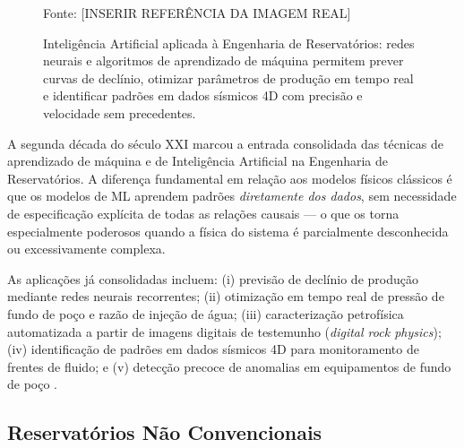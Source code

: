 \documentclass[
  12pt,
  a4paper,
  oneside,
  brazilian,
  sumario=tradicional
]{abntex2}
\renewcommand{\fonte}[1]{\vspace{2pt}\par\noindent\footnotesize Fonte: #1}
\begin{document}
\begin{figure}[H]
  \centering
  \caption{Inteligência Artificial aplicada à Engenharia de Reservatórios: redes neurais e algoritmos de aprendizado de máquina permitem prever curvas de declínio, otimizar parâmetros de produção em tempo real e identificar padrões em dados sísmicos 4D com precisão e velocidade sem precedentes.}
  \label{fig:ia_reservatorio}
  \fonte{[INSERIR REFERÊNCIA DA IMAGEM REAL]}
\end{figure}

A segunda década do século XXI marcou a entrada consolidada das
técnicas de aprendizado de máquina e de Inteligência Artificial na
Engenharia de Reservatórios. A diferença fundamental em relação aos
modelos físicos clássicos é que os modelos de ML aprendem padrões
\textit{diretamente dos dados}, sem necessidade de especificação
explícita de todas as relações causais — o que os torna especialmente
poderosos quando a física do sistema é parcialmente desconhecida ou
excessivamente complexa.

As aplicações já consolidadas incluem: (i) previsão de declínio de
produção mediante redes neurais recorrentes; (ii) otimização em tempo
real de pressão de fundo de poço e razão de injeção de água; (iii)
caracterização petrofísica automatizada a partir de imagens digitais
de testemunho (\textit{digital rock physics}); (iv) identificação de
padrões em dados sísmicos 4D para monitoramento de frentes de fluido;
e (v) detecção precoce de anomalias em equipamentos de fundo de poço
\cite{ahmed2010, ramos2016}.

\subsection{Reservatórios Não Convencionais}
\end{document}

